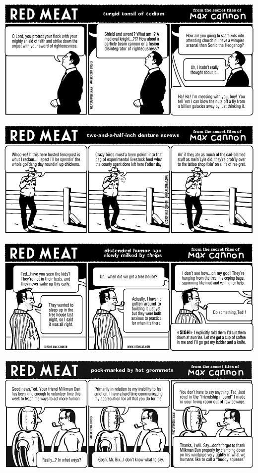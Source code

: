 \documentclass[a4paper,twoside,11pt]{article}
\begin{document}
\includegraphics[width=\textwidth]{redmeat_2009-05-05.png}



\includegraphics[width=\textwidth]{redmeat_2009-05-12.png}



\includegraphics[width=\textwidth]{redmeat_2009-05-19.png}



\includegraphics[width=\textwidth]{redmeat_2009-05-26.png}
\end{document}
